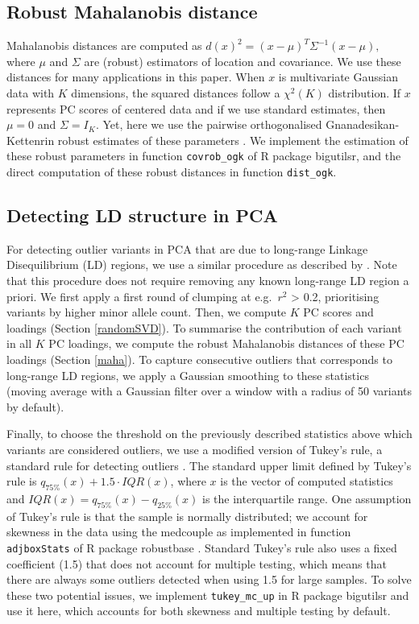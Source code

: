 \documentclass{bioinfo}
\begin{document}
\begin{methods}
\subsection{Robust Mahalanobis distance \label{maha}}

Mahalanobis distances are computed as $d(x)^2 = (x-\mu)^T \Sigma^{-1} (x-\mu),$ where $\mu$ and $\Sigma$ are (robust) estimators of location and covariance.
We use these distances for many applications in this paper. 
When $x$ is multivariate Gaussian data with $K$ dimensions, the squared distances follow a $\chi^2(K)$ distribution.
If $x$ represents PC scores of centered data and if we use standard estimates, then $\mu = 0$ and $\Sigma = I_K$.
Yet, here we use the pairwise orthogonalised Gnanadesikan-Kettenrin robust estimates of these parameters \cite[]{gnanadesikan1972robust,yohai1988high,maronna2002robust}.
We implement the estimation of these robust parameters in function \texttt{covrob\_ogk} of R package bigutilsr, and the direct computation of these robust distances in function \texttt{dist\_ogk}. 

\subsection{Detecting LD structure in PCA}

For detecting outlier variants in PCA that are due to long-range Linkage Disequilibrium (LD) regions, we use a similar procedure as described by \cite{prive2017efficient}.
Note that this procedure does not require removing any known long-range LD region a priori.
We first apply a first round of clumping at e.g.\ $r^2$ > 0.2, prioritising variants by higher minor allele count.
Then, we compute $K$ PC scores and loadings (Section \ref{randomSVD}).
To summarise the contribution of each variant in all $K$ PC loadings, we compute the robust Mahalanobis distances of these PC loadings (Section \ref{maha}).  
To capture consecutive outliers that corresponds to long-range LD regions, we apply a Gaussian smoothing to these statistics (moving average with a Gaussian filter over a window with a radius of 50 variants by default).

Finally, to choose the threshold on the previously described statistics above which variants are considered outliers, we use a modified version of Tukey's rule, a standard rule for detecting outliers \cite[]{tukey77}. 
The standard upper limit defined by Tukey's rule is $q_{75\%}(x) + 1.5 \cdot IQR(x)$, where $x$ is the vector of computed statistics and $IQR(x) = q_{75\%}(x) - q_{25\%}(x)$ is the interquartile range.
One assumption of Tukey's rule is that the sample is normally distributed; we account for skewness in the data using the medcouple as implemented in function \texttt{adjboxStats} of R package robustbase \cite[]{brys2004robust,hubert2008adjusted}. 
Standard Tukey's rule also uses a fixed coefficient (1.5) that does not account for multiple testing, which means that there are always some outliers detected when using 1.5 for large samples. 
To solve these two potential issues, we implement \texttt{tukey\_mc\_up} in R package bigutilsr and use it here, which accounts for both skewness and multiple testing by default.


\end{methods}
\end{document}

